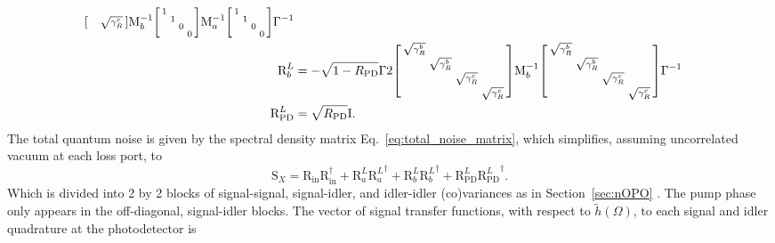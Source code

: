 \begin{align}
\begin{bsmallmatrix}
 &  &  & \sqrt{\gamma^c_R}
\end{bsmallmatrix}\text{M}_b^{-1}\begin{bsmallmatrix}
1 &  &  &  \\
 & 1 &  &  \\
 &  & 0 &  \\
 &  &  & 0
\end{bsmallmatrix}\text{M}_a^{-1}\begin{bsmallmatrix}
1 &  &  &  \\
 & 1 &  &  \\
 &  & 0 &  \\
 &  &  & 0
\end{bsmallmatrix}\Gamma^{-1}\\
\text{R}^L_b&=-\sqrt{1-R_\text{PD}}\Gamma 2\begin{bsmallmatrix}
\sqrt{\gamma^b_R} &  &  &  \\
 & \sqrt{\gamma^b_R} &  &  \\
 &  & \sqrt{\gamma^c_R} &  \\
 &  &  & \sqrt{\gamma^c_R}
\end{bsmallmatrix}\text{M}_b^{-1}\begin{bsmallmatrix}
\sqrt{\gamma^b_R} &  &  &  \\
 & \sqrt{\gamma^b_R} &  &  \\
 &  & \sqrt{\gamma^c_R} &  \\
 &  &  & \sqrt{\gamma^c_R}
\end{bsmallmatrix}\Gamma^{-1}\\
\text{R}^L_\text{PD}&=\sqrt{R_\text{PD}} \text{I}.
\end{align}
\endgroup
The total quantum noise is given by the spectral density matrix Eq.~\ref{eq:total_noise_matrix}, which simplifies, assuming uncorrelated vacuum at each loss port, to
\begin{equation}
\text{S}_X=\text{R}_\text{in}\text{R}_\text{in}^\dag+\text{R}^L_a{\text{R}^L_a}^\dag+\text{R}^L_b{\text{R}^L_b}^\dag+\text{R}^L_\text{PD}{\text{R}^L_\text{PD}}^\dag.
\end{equation} %
Which is divided into 2 by 2 blocks of signal-signal, signal-idler, and idler-idler (co)variances as in Section~\ref{sec:nOPO} . The pump phase only appears in the off-diagonal, signal-idler blocks.
The vector of signal transfer functions, with respect to $\tilde h(\Omega)$, to each signal and idler quadrature at the photodetector is
